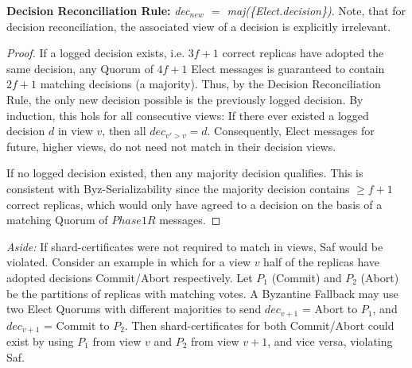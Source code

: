 \textbf{Decision Reconciliation Rule:} \textit{dec$_{new}$ $=$ maj(\{Elect.decision\})}. Note, that for decision reconciliation, the associated view of a decision is explicitly irrelevant.

\begin{proof} If a logged decision exists, i.e. $3f+1$ correct replicas have adopted the same decision, any Quorum of $4f+1$ Elect messages is guaranteed to contain $2f+1$ matching decisions (a majority). Thus, by the Decision Reconciliation Rule, the only new decision possible is the previously logged decision. By induction, this hols for all consecutive views: If there ever existed a logged decision $d$ in view $v$, then all $dec_{v' > v} = d$. Consequently, Elect messages for future, higher views, do not need not match in their decision views.

If no logged decision existed, then any majority decision qualifies. This is consistent with Byz-Serializability since the majority decision contains $\geq f+1$ correct replicas, which would only have agreed to a decision on the basis of a matching Quorum of $Phase1R$ messages.
\end{proof}

\textit{Aside:} If shard-certificates were not required to match in views, Saf would be violated. Consider an example in which for a view $v$ half of the replicas have adopted decisions Commit/Abort respectively. Let $P_1$ (Commit) and $P_2$ (Abort) be the partitions of replicas with matching votes. A Byzantine Fallback may use two Elect Quorums with different majorities to send $dec_{v+1}$ = Abort to $P_1$, and $dec_{v+1}$ = Commit to $P_2$. Then shard-certificates for both Commit/Abort could exist by using $P_1$ from view $v$ and $P_2$ from view $v+1$, and vice versa, violating Saf. 